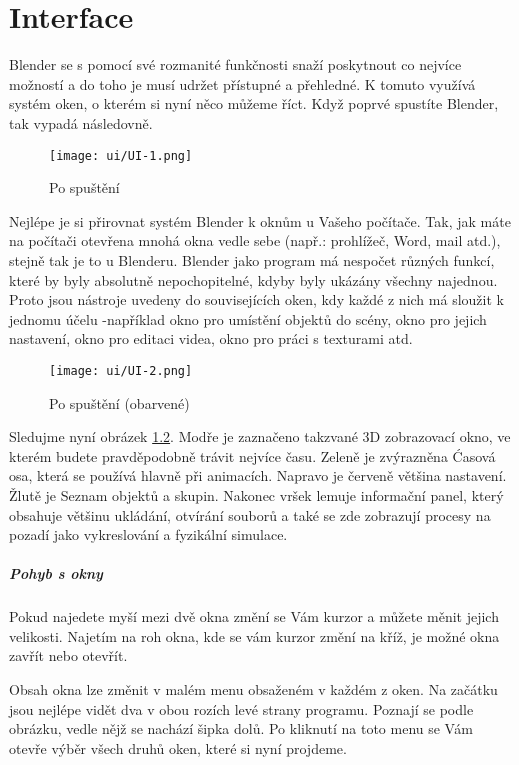 \documentclass[12pt,a4paper]{report}
\begin{document}
	\chapter{Interface}
	Blender se s pomocí své rozmanité funkčnosti snaží poskytnout co nejvíce
	možností a do toho je musí udržet přístupné a přehledné. K tomuto
	využívá systém oken, o kterém si nyní něco můžeme říct.
	Když poprvé spustíte Blender, tak vypadá následovně.
	
	\begin{figure}[h]
		\centering
		\texttt{[image: ui/UI-1.png]}
		\caption{Po spuštění}
		\label{pic:startup-1}
	\end{figure}

	Nejlépe je si přirovnat systém Blender k oknům u Vašeho počítače. Tak,
	jak máte na počítači otevřena mnohá okna vedle sebe (např.: prohlížeč,
	Word, mail atd.), stejně tak je to u Blenderu. Blender jako program má
	nespočet různých funkcí, které by byly absolutně nepochopitelné, kdyby
	byly ukázány všechny najednou. Proto jsou nástroje uvedeny do
	souvisejících oken, kdy každé z nich má sloužit k jednomu účelu -například okno pro umístění objektů do scény, okno pro jejich nastavení,
	okno pro editaci videa, okno pro práci s texturami atd.
	
	\begin{figure}[h]
		\centering
		\texttt{[image: ui/UI-2.png]}
		\caption{Po spuštění (obarvené)}
		\label{pic:startup-2}
	\end{figure}

	Sledujme nyní obrázek \ref{pic:startup-2}. Modře je zaznačeno takzvané 3D zobrazovací
	okno, ve kterém budete pravděpodobně trávit nejvíce času. Zeleně je
	zvýrazněna Ćasová osa, která se používá hlavně při animacích. Napravo
	je červeně většina nastavení. Žlutě je Seznam objektů a skupin. Nakonec
	vršek lemuje informační panel, který obsahuje většinu ukládání, otvírání
	souborů a také se zde zobrazují procesy na pozadí jako vykreslování
	a fyzikální simulace.
	
	\paragraph{Pohyb s okny} Pokud najedete myší mezi dvě okna změní se Vám
	kurzor a můžete měnit jejich velikosti. Najetím na roh okna, kde se vám
	kurzor změní na kříž, je možné okna zavřít nebo otevřít.
	
	Obsah okna lze změnit v malém menu obsaženém v každém z oken. Na
	začátku jsou nejlépe vidět dva v obou rozích levé strany programu.
	Poznají se podle obrázku, vedle nějž se nachází šipka dolů. Po kliknutí na
	toto menu se Vám otevře výběr všech druhů oken, které si nyní
	projdeme.
	
\end{document}
